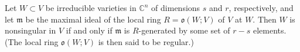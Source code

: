 Let $W \subset V$ be irreducible varieties in $\mathbb{C}^n$ of dimensions $s$ and $r$, respectively, and let $\mathfrak{m}$ be the maximal ideal of the local ring $R = \mathfrak{o}(W; V)$ of $V$ at $W$. Then $W$ is nonsingular in $V$ if and only if $\mathfrak{m}$ is $R$-generated by some set of $r - s$ elements. (The local ring $\mathfrak{o}(W; V)$ is then said to be regular.)
